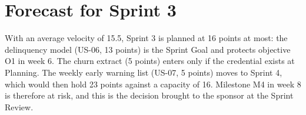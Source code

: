 \documentclass[10pt,a4paper]{article}
\begin{document}
\section{Forecast for Sprint 3}
With an average velocity of 15.5, Sprint 3 is planned at 16 points at most: the delinquency model (US-06, 13 points) is
the Sprint Goal and protects objective O1 in week 6. The churn extract (5 points) enters only if the credential exists
at Planning. The weekly early warning list (US-07, 5 points) moves to Sprint 4, which would then hold 23 points against
a capacity of 16. Milestone M4 in week 8 is therefore at risk, and this is the decision brought to the sponsor at the
Sprint Review.
\end{document}
